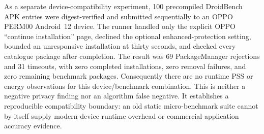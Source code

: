 As a separate device-compatibility experiment, 100 precompiled DroidBench APK entries were digest-verified and submitted sequentially to an OPPO PERM00 Android~12 device. The runner handled only the explicit OPPO ``continue installation'' page, declined the optional enhanced-protection setting, bounded an unresponsive installation at thirty seconds, and checked every catalogue package after completion. The result was 69 PackageManager rejections and 31 timeouts, with zero completed installations, zero removal failures, and zero remaining benchmark packages. Consequently there are no runtime PSS or energy observations for this device/benchmark combination. This is neither a negative privacy finding nor an algorithm false negative. It establishes a reproducible compatibility boundary: an old static micro-benchmark suite cannot by itself supply modern-device runtime overhead or commercial-application accuracy evidence.
